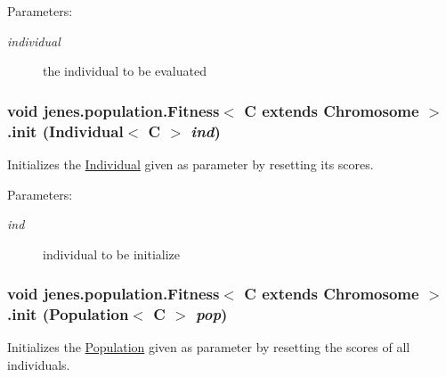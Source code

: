 \begin{Desc}
\item[Parameters:]
\begin{description}
\item[{\em individual}]the individual to be evaluated \end{description}
\end{Desc}
\hypertarget{classjenes_1_1population_1_1_fitness_3_01_c_01extends_01_chromosome_01_4_1b67ac3ad38e0d5ce0ba6a75708a5e2d}{
\subsubsection[init]{\setlength{\rightskip}{0pt plus 5cm}void jenes.population.Fitness$<$ C extends Chromosome $>$.init (Individual$<$ C $>$ {\em ind})}}
\label{classjenes_1_1population_1_1_fitness_3_01_c_01extends_01_chromosome_01_4_1b67ac3ad38e0d5ce0ba6a75708a5e2d}


Initializes the \hyperlink{}{Individual} given as parameter by resetting its scores. 

\begin{Desc}
\item[Parameters:]
\begin{description}
\item[{\em ind}]individual to be initialize \end{description}
\end{Desc}
\hypertarget{classjenes_1_1population_1_1_fitness_3_01_c_01extends_01_chromosome_01_4_fc31605de5bbaae2ca16718628c72847}{
\subsubsection[init]{\setlength{\rightskip}{0pt plus 5cm}void jenes.population.Fitness$<$ C extends Chromosome $>$.init (Population$<$ C $>$ {\em pop})}}
\label{classjenes_1_1population_1_1_fitness_3_01_c_01extends_01_chromosome_01_4_fc31605de5bbaae2ca16718628c72847}


Initializes the \hyperlink{}{Population} given as parameter by resetting the scores of all individuals. 

